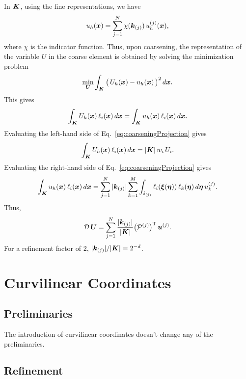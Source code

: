 \documentclass[10pt]{article}
\newcommand{\trans}{\textsc{T}}
\begin{document}
In $\boldsymbol{K}$, using the fine representations, we have
\begin{equation}
  u_{h}(\boldsymbol{x}) = \sum_{j=1}^{N}\chi(\boldsymbol{k}_{(j)})\,u_{h}^{(j)}(\boldsymbol{x}),
\end{equation}
where $\chi$ is the indicator function.
Thus, upon coarsening, the representation of the variable $U$ in the coarse element is obtained by solving the minimization problem
\begin{equation}
  \min_{\boldsymbol{U}}\int_{\boldsymbol{K}}\big(\,U_{h}(\boldsymbol{x})-u_{h}(\boldsymbol{x})\,\big)^{2}\,d\boldsymbol{x}.
\end{equation}
This gives
\begin{equation}
  \int_{\boldsymbol{K}}U_{h}(\boldsymbol{x})\,\ell_{i}(\boldsymbol{x})\,d\boldsymbol{x}
  =\int_{\boldsymbol{K}}u_{h}(\boldsymbol{x})\,\ell_{i}(\boldsymbol{x})\,d\boldsymbol{x}.
  \label{eq:coarseningProjection}
\end{equation}
Evaluating the left-hand side of Eq.~\eqref{eq:coarseningProjection} gives
\begin{equation}
  \int_{\boldsymbol{K}}U_{h}(\boldsymbol{x})\,\ell_{i}(\boldsymbol{x})\,d\boldsymbol{x}
  =|\boldsymbol{K}|\,w_{i}\,U_{i}.
\end{equation}
Evaluating the right-hand side of Eq.~\eqref{eq:coarseningProjection} gives
\begin{equation}
  \int_{\boldsymbol{K}}u_{h}(\boldsymbol{x})\,\ell_{i}(\boldsymbol{x})\,d\boldsymbol{x}
  =\sum_{j=1}^{N}|\boldsymbol{k}_{(j)}|\sum_{k=1}^{M}\int_{\boldsymbol{i}_{(j)}}\ell_{i}(\boldsymbol{\xi}(\boldsymbol{\eta}))\,\ell_{k}(\boldsymbol{\eta})\,d\boldsymbol{\eta}\,u_{k}^{(j)}.
\end{equation}
Thus,
\begin{equation}
  \mathcal{D}\,\vect{U}=\sum_{j=1}^{N}\f{|\vect{k}_{(j)}|}{|\vect{K}|}
  \big(\mathcal{P}^{(j)}\big)^{\trans}\,\vect{u}^{(j)}.
\end{equation}
For a refinement factor of $2$, $|\boldsymbol{k}_{(j)}|/|\boldsymbol{K}|=2^{-d}$.

\section{Curvilinear Coordinates}

\subsection{Preliminaries}

The introduction of curvilinear coordinates doesn't change any of the preliminaries.

\subsection{Refinement}
\end{document}
